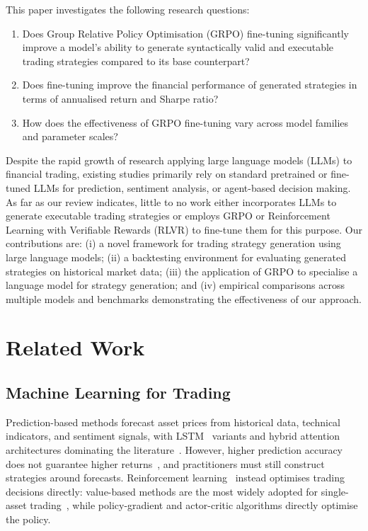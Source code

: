 \documentclass[conference,a4paper]{IEEEtran}
\begin{document}
This paper investigates the following research questions:
\begin{enumerate}
  \item[\textbf{RQ1}] Does Group Relative Policy Optimisation (GRPO) fine-tuning significantly improve a model's ability to generate
    syntactically valid and executable trading strategies compared to its base counterpart?
  \item[\textbf{RQ2}] Does fine-tuning improve the financial performance of generated strategies
    in terms of annualised return and Sharpe ratio?
  \item[\textbf{RQ3}] How does the effectiveness of GRPO fine-tuning vary across model families
    and parameter scales?
\end{enumerate}

Despite the rapid growth of research applying large language models (LLMs) to financial
trading, existing studies primarily rely on standard pretrained or fine-tuned LLMs for
prediction, sentiment analysis, or agent-based decision making. As far as our review
indicates, little to no work either incorporates LLMs to generate executable trading
strategies or employs GRPO or Reinforcement Learning with Verifiable Rewards (RLVR) to
fine-tune them for this purpose.
Our contributions are: (i) a novel framework for trading strategy generation using large
language models; (ii) a backtesting environment for evaluating generated strategies on
historical market data; (iii) the application of GRPO to specialise a language model for
strategy generation; and (iv) empirical comparisons across multiple models and benchmarks
demonstrating the effectiveness of our approach.

\section{Related Work}
\label{ch:related}

\subsection{Machine Learning for Trading}
Prediction-based methods forecast asset prices from historical data, technical
indicators, and sentiment signals, with LSTM~\cite{hochreiter1997lstm} variants and
hybrid attention architectures dominating the literature~\cite{huang2024novel}. However,
higher prediction accuracy does not guarantee higher returns~\cite{huang2024novel}, and
practitioners must still construct strategies around forecasts. Reinforcement
learning~\cite{sutton2018rl} instead optimises trading decisions directly: value-based
methods are the most widely adopted for single-asset trading~\cite{huang2024novel}, while
policy-gradient and actor-critic algorithms directly optimise the policy.
\end{document}
